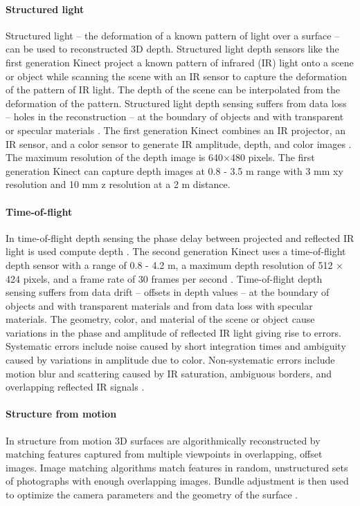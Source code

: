 \documentclass{article}
\begin{document}
\paragraph{Structured light}
Structured light -- the deformation of a known pattern of light over a surface -- can be used to reconstructed 3D depth. 
%
Structured light depth sensors like the first generation Kinect 
project a known pattern of infrared (IR) light onto a scene or object 
while scanning the scene with an IR sensor
to capture the deformation of the pattern of IR light. 
The depth of the scene can be interpolated from the deformation of the pattern. %
%
Structured light depth sensing suffers from data loss -- holes in the reconstruction -- 
at the boundary of objects and with transparent or specular materials \citep{Hansard2013}. 
%
The first generation Kinect combines an IR projector, an IR sensor, and a color sensor 
to generate IR amplitude, depth, and color images \citep{Smisek2011,Hansard2013}. 
The maximum resolution of the depth image is 640×480 pixels. 
%
The first generation Kinect can capture depth images
at 0.8 - 3.5 m range 
with 3 mm xy resolution and 10 mm z resolution at a 2 m distance. 
%


\paragraph{Time-of-flight}
In time-of-flight depth sensing
the phase delay between projected and reflected IR light 
is used compute depth \citep{Hansard2013}. 
%
The second generation Kinect uses a time-of-flight depth sensor 
with a range of 0.8 - 4.2 m, a maximum depth resolution of 512 × 424 pixels, and a frame rate of 30 frames per second \citep{Bamji2015}. 
%
Time-of-flight depth sensing suffers from data drift -- offsets in depth values -- 
at the boundary of objects and with transparent materials 
and from data loss with specular materials.
%
The geometry, color, and material of the scene or object cause 
variations in the phase and amplitude of reflected IR light giving rise to errors. 
%
Systematic errors include noise caused by short integration times
and ambiguity caused by variations in amplitude due to color. 
%
Non-systematic errors include motion blur 
and scattering caused by IR saturation, ambiguous borders, and overlapping reflected IR signals 
\citep{Hansard2013}. 

\paragraph{Structure from motion}
In structure from motion 
3D surfaces are algorithmically reconstructed 
by matching features captured from multiple viewpoints in overlapping, offset images. 
%
Image matching algorithms match features in random, unstructured sets of photographs 
with enough overlapping images.
Bundle adjustment is then used to optimize the camera parameters and the geometry of the surface 
\citep{Westoby2012, Fonstad2013,Snavely2008}. 
\end{document}
